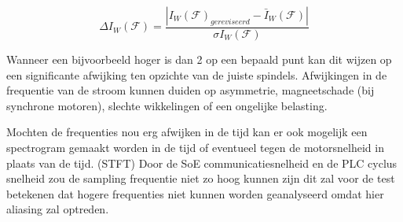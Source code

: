 {\begin{equation}
	\Delta I_W\left(\mathcal{F}\right)=\frac{\left|{I_W\left(\mathcal{F}\right)}_{gereviseerd}-{\bar{I}}_W\left(\mathcal{F}\right)\right|}{{\sigma I}_W\left(\mathcal{F}\right)}
\end{equation}

Wanneer een bijvoorbeeld hoger is dan 2 op een bepaald punt kan dit wijzen op een significante afwijking ten opzichte van de juiste spindels. Afwijkingen in de frequentie van de stroom kunnen duiden op asymmetrie, magneetschade (bij synchrone motoren), slechte wikkelingen of een ongelijke belasting. 

}{Mochten de frequenties nou erg afwijken in de tijd kan er ook mogelijk een spectrogram gemaakt worden in de tijd of eventueel tegen de motorsnelheid in plaats van de tijd. (\gls{STFT}) \cite{web:STFT}
Door de \gls{SoE} communicatiesnelheid en de \gls{PLC} cyclus snelheid zou de sampling frequentie niet zo hoog kunnen zijn dit zal voor de test betekenen dat hogere frequenties niet kunnen worden geanalyseerd omdat hier aliasing zal optreden.
}


